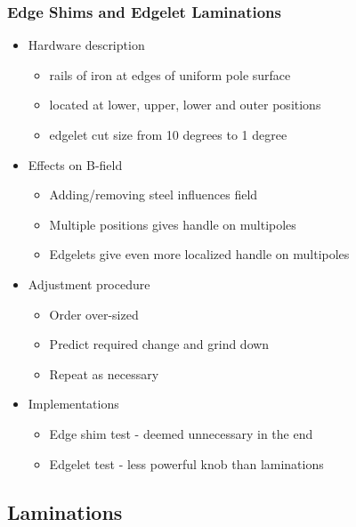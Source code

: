 \subsubsection{Edge Shims and Edgelet Laminations}

\begin{itemize}
  \item Hardware description
    \begin{itemize}
      \item rails of iron at edges of uniform pole surface
      \item located at lower, upper, lower and outer positions
      \item edgelet cut size from 10 degrees to 1 degree
    \end{itemize}
  \item Effects on B-field
    \begin{itemize}
      \item Adding/removing steel influences field
      \item Multiple positions gives handle on multipoles
      \item Edgelets give even more localized handle on multipoles
    \end{itemize}
  \item Adjustment procedure
    \begin{itemize}
      \item Order over-sized
      \item Predict required change and grind down
      \item Repeat as necessary
    \end{itemize}
  \item Implementations
    \begin{itemize}
      \item Edge shim test - deemed unnecessary in the end
      \item Edgelet test - less powerful knob than laminations
    \end{itemize}
\end{itemize}


\subsection{Laminations}

